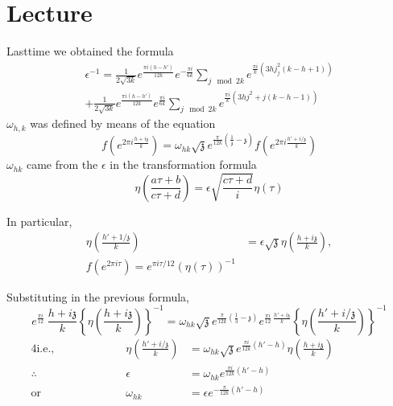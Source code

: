 \chapter{Lecture}\label{part3:lec23} %

Last\pageoriginale time we obtained the formula
\begin{multline*}
  \epsilon ^{-1} = \frac{1}{2 \sqrt{3k}} e^{\frac{\pi i (h- h')}{12k}} e^{-
    \frac{\pi i}{6k}} \sum_{j \mod 2k} e^{\frac{\pi i}{k} \left(3 hj^2
    _ j(k- h+1)\right)}\\
  + \frac{1}{2\sqrt{3k}} e^{\frac{\pi i (h- h')}{12k}} e^{\frac{\pi
      i}{6k}} \sum_{j \mod 2k} e^{\frac{\pi i}{k} (3 hj^2 + j(k-h-1))}
\end{multline*}
$\omega_{h, k}$ was defined by means of the equation
$$
f\left(e^{2 \pi i \frac{h+ i\mathfrak{z}}{k}} \right)= \omega_{hk}
  \sqrt{\mathfrak{z}} e^{\frac{\pi}{12k} \left(\frac{1}{\mathfrak{z}} -
    \mathfrak{z}\right)} f\left( e^{2 \pi i \frac{h'+ i /\mathfrak{z}}{k}}\right)
$$
$\omega_{hk}$ came from the $\epsilon $ in the transformation formula
$$
\eta \left( \frac{a \tau+b}{c \tau+d}\right)= \epsilon  \sqrt{\frac{c \tau
    +d}{i}} \eta ( \tau)
$$

In particular, 
\begin{align*}
  \eta \left( \frac{h'+ 1/\mathfrak{z}}{k}\right) & = \epsilon 
  \sqrt{\mathfrak{z}} \eta \left( \frac{h+ i\mathfrak{z}}{k}\right),\\
  f\left(e^{2 \pi i \tau} \right)= e^{\pi i \tau/12} (\eta (\tau))^{-1}
\end{align*}

Substituting in the previous formula,
$$
e^{\frac{\pi i}{12}} ~\frac{h+ i \mathfrak{z}}{k} \left\{ \eta
\left(\frac{h+ i \mathfrak{z}}{k} \right) \right\}^{-1} = \omega_{hk}
  \sqrt{\mathfrak{z}} e^{\frac{\pi}{12k} \left(\frac{1}{3}
    -\mathfrak{z} \right)} e^{\frac{\pi i}{12} ~\frac{h' +
      i\mathfrak{z}}{k}} \left\{ \eta \left( \frac{h' + i
      /\mathfrak{z}}{k}\right) \right\}^{-1}
$$
\begin{alignat*}{4}
  \text{i.e.,} &\hspace{2cm}& \eta\left(\frac{h'+ i/\mathfrak{z}}{k}
  \right) & = 
  \omega_{hk} \sqrt{\mathfrak{z}} e^{\frac{\pi i}{12k} (h' -h)} \eta
  \left( \frac{h+ i\mathfrak{z}}{k}\right)\hspace{2cm}\\
  \therefore~~ && \epsilon  & = \omega_{hk} e^{\frac{\pi i}{12k} (h'-h) }\\
  \text{or}~~~ && \omega_{hk} & = \epsilon  e^{- \frac{\pi}{12k} (h'-h)}
\end{alignat*}\pageoriginale

